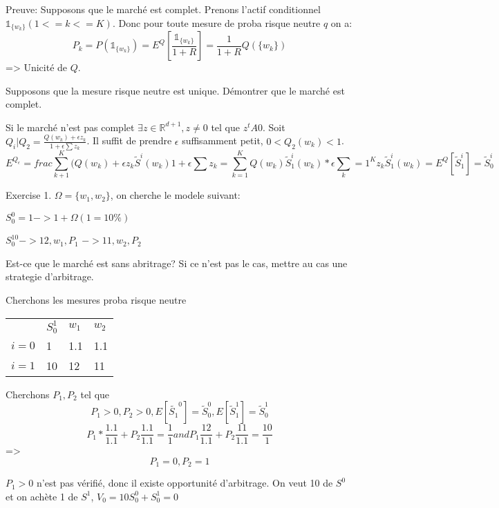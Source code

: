 \documentclass{article}
\begin{document}
Preuve: Supposons que le march\'e est complet. Prenons l'actif conditionnel $\mathbb{1}_{\{w_k\}}(1<=k<=K)$. Donc pour toute mesure de proba risque neutre $q$ on a:
\begin{equation}
P_k=P(\mathbb{1}_{\{w_k\}})=E^Q[\frac{\mathbb{1}_{\{w_k\}}}{1+R}]=\frac{1}{1+R}Q(\{w_k\})
\end{equation}
=> Unicit\'e de $Q$.

Supposons que la mesure risque neutre est unique. D\'emontrer que le march\'e est complet.

Si le march\'e n'est pas complet $\exists z\in\mathbb{R}^{d+1}, z\neq 0$ tel que $z^tA0$. Soit $Q_i|Q_2=\frac{Q(w_k)+\epsilon z_k}{1+\epsilon \sum z_k}$. Il suffit de prendre $\epsilon$ suffisamment petit, $0<Q_2(w_k)<1$.
\begin{equation}
E^{Q_\epsilon}=frac{\sum_{k+1}^K (Q(w_k)+\epsilon z_k \tilde{S}^i(w_k)}{1+\epsilon \sum z_k}=\sum_{k=1}^K Q(w_k) \tilde{S}_1^i(w_k)*\epsilon \sum_k=1^{K} z_k \tilde{S}_1^i (w_k)=E^Q[\tilde{S}_1^i]=\tilde{S}_0^i
\end{equation}

Exercise
1. $\Omega=\{w_1, w_2\}$, on cherche le modele suivant:

$S_0^0=1 -> 1+\Omega(1=10\%)$

$S_0^10->12, w_1,P_1$
$-> 11, w_2,P_2$

Est-ce que le march\'e est sans abritrage? Si ce n'est pas le cas, mettre au cas une strategie d'arbitrage.

Cherchons les mesures proba risque neutre
\begin{tabular}{llll}
   & $S_0^1$ & $w_1$ & $w_2$ \\
 $i=0$ & 1 & 1.1 & 1.1 \\
 $i=1$ & 10 & 12 & 11 \\
\end{tabular}
Cherchons $P_1, P_2$ tel que 
\begin{equation}
P_1>0, P_2>0, E[\tilde{S_1}^0] = \tilde{S}_0^0, E[\tilde{S}_1^1]=\tilde{S}_0^1
\end{equation}
\begin{equation}
P_1*\frac{1.1}{1.1}+P_2\frac{1.1}{1.1}=\frac{1}{1} and P_1\frac{12}{1.1}+P_2\frac{11}{1.1}=\frac{10}{1}
\end{equation}
=>
\begin{equation}
P_1=0, P_2=1
\end{equation}
 
$P_1>0$ n'est pas v\'erifi\'e, donc il existe opportunit\'e d'arbitrage.
On veut 10 de $S^0$ et on ach\`ete 1 de $S^1$,
$V_0=10S_0^0+S_0^1=0$
\end{document}
